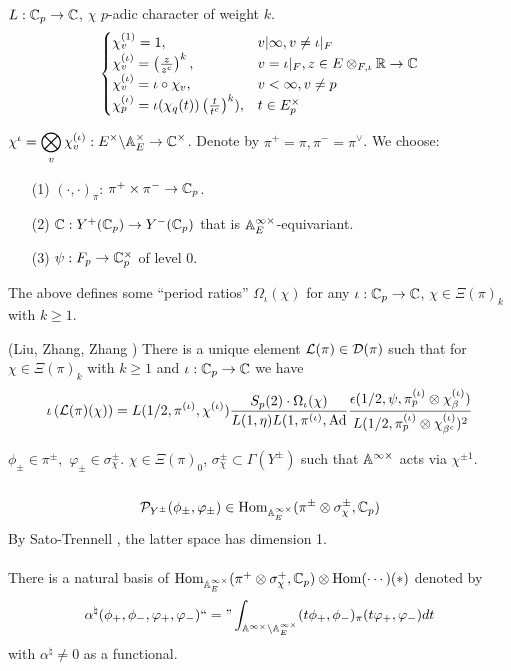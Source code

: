 \documentclass[12pt,amsfont]{amsart}
\begin{document}
$L: {\mathbb C}_p \rightarrow {\mathbb C}$, $\chi$ $p$-adic character of weight $k$. 
\[\begin{cases}\chi_v^{(1)} = 1, & v | \infty, v \ne \iota |_F \\ 
\chi_v^{(\iota)} = \left(\frac{z}{z^c}\right)^k, & v = \iota |_F, z \in E \otimes_{F, \iota} {\mathbb R} \rightarrow {\mathbb C} \\ 
\chi_v^{(\iota)} = \iota \circ \chi_v, & v < \infty, v \ne p \\
\chi_p^{(\iota)} = \iota (\chi_q(t))\left(\frac{t}{t^c}\right)^k), & t \in E_p^\times \end{cases} \] 

$\chi^{\iota} = \displaystyle \bigotimes_v \chi_v^{(\iota)} : E^\times \backslash \mathbb{A}_E^\times \rightarrow {\mathbb C}^\times$. Denote by $\pi^+ = \pi, \pi^{-} = \pi^\vee$. We choose:
{\ }
\begin{enumerate}
\item[(1)]
$(\cdot, \cdot)_\pi$: $\pi^+ \times \pi^{-} \rightarrow {\mathbb C}_p$. 
\item[(2)]
${\mathbb C}: Y^+({\mathbb C}_p) \rightarrow Y^{-}({\mathbb C}_p)$ that is $\mathbb{A}_E^{\infty \times}$-equivariant.
\item[(3)]
$\psi: F_p \rightarrow {\mathbb C}_p^\times$ of level 0.
\end{enumerate}

The above defines some ``period ratios'' $\Omega_\iota(\chi)$ for any $\iota : {\mathbb C}_p \rightarrow {\mathbb C}$, $\chi \in \Xi(\pi)_k$ with $k \geq 1$. 

\begin{thm} (Liu, Zhang, Zhang ) There is a unique element $\mathcal{L}(\pi) \in \mathcal{D}(\pi)$ such that for $\chi \in \Xi(\pi)_k$ with $k \geq 1$ and $\iota: {\mathbb C}_p \rightarrow {\mathbb C}$ we have
\[ \iota \left(\mathcal{L}(\pi)(\chi) \right) = L(1/2, \pi^{(\iota)}, \chi^{(\iota)}) \frac{S_p(2) \cdot \Omega_\iota(\chi)}{L(1, \eta) L(1, \pi^{(\iota)}, \operatorname{Ad}} \frac{\epsilon(1/2, \psi, \pi_p^{(\iota)} \otimes \chi_{\beta}^{(\iota)})}{L(1/2, \pi_p^{(\iota)} \otimes \chi_{\beta^c}^{(\iota)})^2}\]
\end{thm}

$\phi_{\pm} \in \pi^\pm,$ $\varphi_\pm \in \sigma_\chi^\pm$. $\chi \in \Xi(\pi)_0$, $\sigma_\chi^\pm \subset \Gamma(Y^\pm)$ such that $\mathbb{A}^{\infty \times}$ acts via $\chi^{\pm 1}$. \\ \\
\[\mathcal{P}_{Y^\pm}(\phi_\pm, \varphi_\pm) \in \operatorname{Hom}_{\mathbb{A}_E^{\infty \times}} (\pi^\pm \otimes \sigma_\chi^\pm, {\mathbb C}_p)\]
By Sato-Trennell , the latter space has dimension 1. \\ \\
There is a natural basis of $\operatorname{Hom}_{\mathbb{A}_E^{\infty \times}} (\pi^+ \otimes \sigma_{\chi}^+, {\mathbb C}_p) \otimes \operatorname{Hom}(\cdots) (\ast)$ denoted by
\[\alpha^\natural (\phi_+, \phi_{-}, \varphi_+, \varphi_{-} )\text{``} = \text{''} \int_{\mathbb{A}^{\infty \times} \backslash \mathbb{A}_E^{\infty \times}} (t \phi_+, \phi_{-})_\pi (t \varphi_+, \varphi_{-}) dt \]
with $\alpha^\natural \ne 0$ as a functional. 
\end{document}
